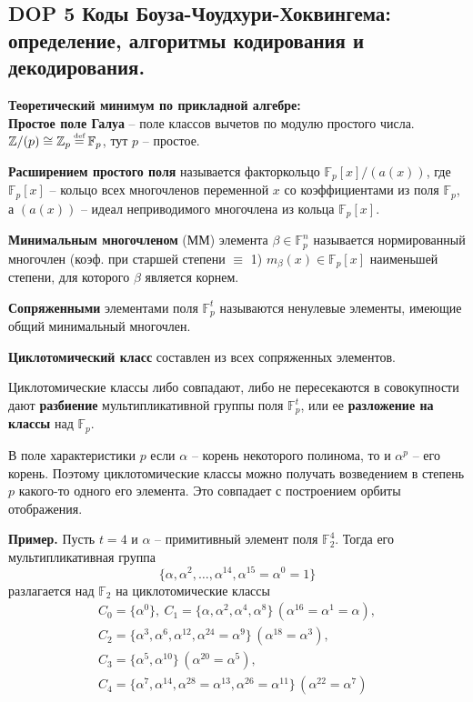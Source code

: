 \newcommand\eqdef{\mathrel{\stackrel{\makebox[0pt]{\mbox{\normalfont\tiny def}}}{=}}}


\subsection{DOP 5 Коды Боуза-Чоудхури-Хоквингема: определение, алгоритмы кодирования и декодирования.}


\textbf{Теоретический минимум по прикладной алгебре:}\\
\textbf{Простое поле Галуа} -- поле классов вычетов по модулю простого числа.
$\mathbb{Z}/(p) \cong \mathbb{Z}_p \eqdef \mathbb{F}_p$, тут $p$ -- простое.

\textbf{Расширением простого поля} называется факторкольцо $\mathbb{F}_p[x]/(a(x))$, где
$\mathbb{F}_p[x]$ -- кольцо всех многочленов переменной $x$ со коэффициентами из поля
$\mathbb{F}_p$, а $(a(x))$ -- идеал неприводимого многочлена из кольца $\mathbb{F}_p[x]$.

\textbf{Минимальным многочленом} (ММ) элемента $\beta \in \mathbb{F}_p^n$ называется
нормированный многочлен (коэф. при старшей степени $\equiv$ 1)
$m_{\beta} (x) \in \mathbb{F}_p[x]$ наименьшей степени, для которого $\beta$ является
корнем.

\textbf{Сопряженными} элементами поля $\mathbb{F}_p^t$ называются ненулевые элементы,
имеющие общий минимальный многочлен.

\textbf{Циклотомический класс} составлен из всех сопряженных элементов.

Циклотомические классы либо совпадают, либо не пересекаются в совокупности дают
\textbf{разбиение} мультипликативной группы поля $\mathbb{F}_p^t$, или ее
\textbf{разложение на классы} над $\mathbb{F}_p$.

В поле характеристики $p$ если $\alpha$ -- корень некоторого полинома,
то и $\alpha^p$ -- его корень. Поэтому циклотомические классы можно получать
возведением в степень $p$ какого-то одного его элемента. Это совпадает с построением
орбиты отображения.

\textbf{Пример.} Пусть $t = 4$ и $\alpha$ -- примитивный элемент
поля $\mathbb{F}^4_2$. Тогда его мультипликативная группа
$$
\{ \alpha, \alpha^2, \dots, \alpha^{14}, \alpha^{15} = \alpha^0 = 1 \}
$$
разлагается над $\mathbb{F}_2$ на циклотомические классы
\begin{gather*}
    C_0 = \{\alpha^0\},
    ~C_1 = \{\alpha, \alpha^2, \alpha^4, \alpha^8 \} \, (\alpha^{16} = \alpha^1 = \alpha),\\
    C_2 = \{\alpha^3, \alpha^6, \alpha^{12}, \alpha^{24} = \alpha^9\} \, (\alpha^{18} = \alpha^3),\\
    C_3 = \{\alpha^5, \alpha^{10}\} \, (\alpha^{20} = \alpha^5),\\
    C_4 = \{\alpha^7, \alpha^{14}, \alpha^{28} = \alpha^{13}, \alpha^{26} = \alpha^{11}\} \, (\alpha^{22} = \alpha^7)
\end{gather*}

